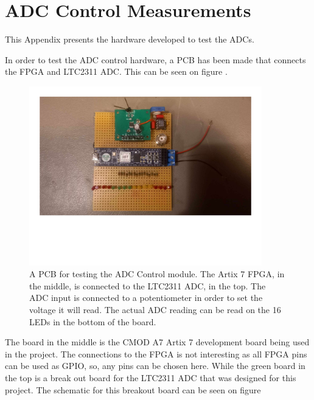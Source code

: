 \chapter{ADC Control Measurements} \label{App:ADCControlMeasurement}
This Appendix presents the hardware developed to test the ADCs.

In order to test the ADC control hardware, a PCB has been made that connects the FPGA and LTC2311 ADC. This can be seen on figure .

\begin{figure}[H]
    \centering
    \includegraphics[clip, trim=0 100 0 0, width=0.9\textwidth]{Appendix/Figures/A_ADC_CONTROL_MEAS_ADC Control Tesr Setup.pdf}
    \caption{A PCB for testing the ADC Control module. The Artix 7 FPGA, in the middle, is connected to the LTC2311 ADC, in the top. The ADC input is connected to a potentiometer in order to set the voltage it will read. The actual ADC reading can be read on the 16 LEDs in the bottom of the board.}
    \label{fig:A_ADC_CONTROL_MEAS_SETUP}
\end{figure}

The board in the middle is the CMOD A7 Artix 7 development board being used in the project. The connections to the FPGA is not interesting as all FPGA pins can be used as GPIO, so, any pins can be chosen here. While the green board in the top is a break out board for the LTC2311 ADC that was designed for this project. The schematic for this breakout board can be seen on figure 

